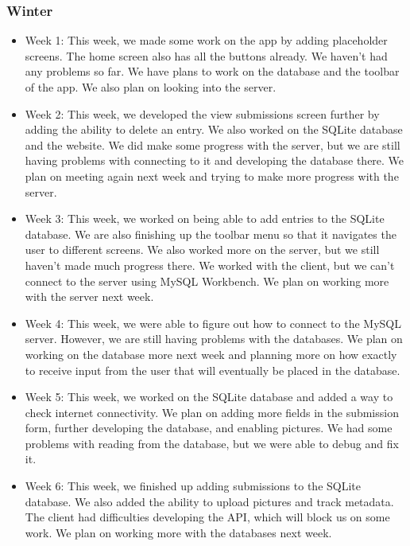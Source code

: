 \documentclass[onecolumn, draftclsnofoot,10pt, compsoc]{IEEEtran}
\begin{document}
 \subsubsection{Winter}
 \begin{itemize}
     \item Week 1: This week, we made some work on the app by adding placeholder screens. The home screen also has all the buttons already. We haven't had any problems so far. We have plans to work on the database and the toolbar of the app. We also plan on looking into the server.
     
     \item Week 2: This week, we developed the view submissions screen further by adding the ability to delete an entry. We also worked on the SQLite database and the website. We did make some progress with the server, but we are still having problems with connecting to it and developing the database there. We plan on meeting again next week and trying to make more progress with the server.
     
     \item Week 3: This week, we worked on being able to add entries to the SQLite database. We are also finishing up the toolbar menu so that it navigates the user to different screens. We also worked more on the server, but we still haven't made much progress there. We worked with the client, but we can't connect to the server using MySQL Workbench. We plan on working more with the server next week.
     
     \item Week 4: This week, we were able to figure out how to connect to the MySQL server. However, we are still having problems with the databases. We plan on working on the database more next week and planning more on how exactly to receive input from the user that will eventually be placed in the database.
     
     \item Week 5: This week, we worked on the SQLite database and added a way to check internet connectivity. We plan on adding more fields in the submission form, further developing the database, and enabling pictures. We had some problems with reading from the database, but we were able to debug and fix it.
     
     \item Week 6: This week, we finished up adding submissions to the SQLite database. We also added the ability to upload pictures and track metadata. The client had difficulties developing the API, which will block us on some work. We plan on working more with the databases next week.
     

\end{itemize}
\end{document}
